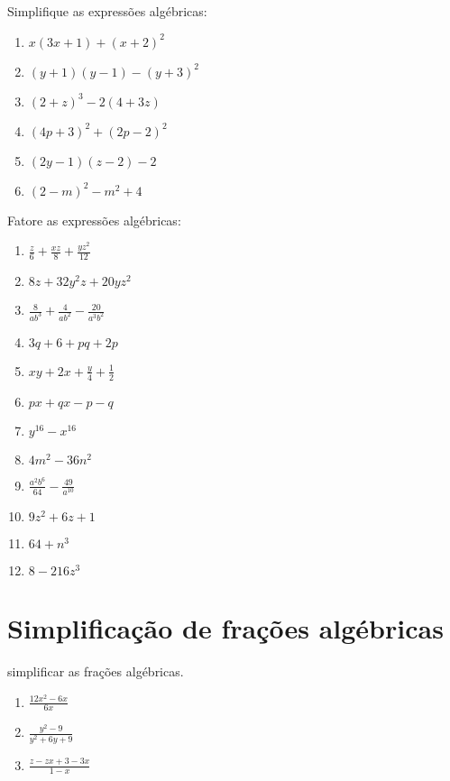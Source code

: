 	 \item Simplifique as expressões algébricas:
	 \begin{multicols}{2}	 
	 \begin{enumerate}
	 	\item $x(3x + 1) + (x + 2)^2$
	 	\item $(y + 1) (y - 1) - (y + 3)^2$
	 	\item $(2 + z)^3 - 2(4 + 3z)$
	 	\item $(4p + 3)^2 + (2p - 2)^2$
	 	\item $(2y - 1)(z - 2) - 2$
	 	\item $(2 - m)^2 - m^2 + 4$ 
	 \end{enumerate}
	 \end{multicols}
	 \item Fatore as expressões algébricas:
	 \begin{multicols}{3}
	 \begin{enumerate}
	 	\item $\displaystyle\frac{z}{6} + \frac{xz}{8} + \frac{yz^2}{12}$
	 	\item $8z + 32y^2z + 20yz^2$
	 	\item $\displaystyle\frac{8}{ab^3} + \frac{4}{ab^2} - \frac{20}{a^3b^2}$
	 	\item $3q + 6 + pq + 2p$
	 	\item $xy + 2x + \displaystyle\frac{y}{4} + \frac{1}{2}$
	 	\item $px + qx - p - q$
	 	\item $y^{16} - x^{16}$
	 	\item $4m^2 - 36n^2$
	 	\item $\displaystyle\frac{a^2b^6}{64} - \frac{49}{a^{10}}$
	 	\item $9z^2 + 6z + 1$
	 	\item $64 + n^3$
	 	\item $8 - 216z^3$
	 \end{enumerate}
	 \end{multicols}


\section{Simplificação de frações algébricas}

	\item simplificar as frações algébricas.
	\begin{multicols}{3}
	\begin{enumerate}
		\item $\displaystyle\frac{12x^2 - 6x}{6x}$
		\item $\displaystyle\frac{y^2 - 9}{y^2 + 6y +9}$
		\item $\displaystyle\frac{z - zx + 3 - 3x}{1 - x}$
	\end{enumerate}
	\end{multicols}
